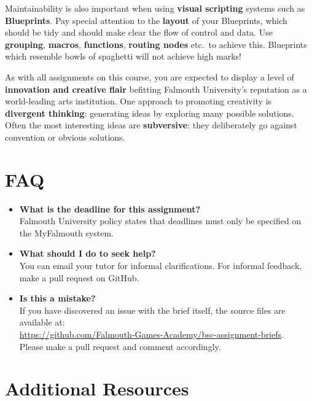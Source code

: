 Maintainability is also important when using \textbf{visual scripting} systems such as \textbf{Blueprints}.
Pay special attention to the \textbf{layout} of your Blueprints,
which should be tidy and should make clear the flow of control and data.
Use \textbf{grouping}, \textbf{macros}, \textbf{functions}, \textbf{routing nodes} etc.\ to achieve this.
Blueprints which resemble bowls of spaghetti will not achieve high marks!

As with all assignments on this course, you are expected to display a level of
\textbf{innovation and creative flair} befitting Falmouth University's reputation as a world-leading
arts institution.
One approach to promoting creativity is
\textbf{divergent thinking}: generating ideas by exploring many possible solutions.
Often the most interesting ideas are \textbf{subversive}: they deliberately go against
convention or obvious solutions.


\section*{FAQ}

\begin{itemize}
	\item 	\textbf{What is the deadline for this assignment?} \\ 
    		Falmouth University policy states that deadlines must only be specified on the MyFalmouth system.
    		
	\item 	\textbf{What should I do to seek help?} \\ 
    		You can email your tutor for informal clarifications. For informal feedback, make a pull request on GitHub. 
    		
    	\item 	\textbf{Is this a mistake?} \\ 	
    		If you have discovered an issue with the brief itself, the source files are available at: \\
    		\url{https://github.com/Falmouth-Games-Academy/bsc-assignment-briefs}.\\
    		 Please make a pull request and comment accordingly.
\end{itemize}

\section*{Additional Resources}

